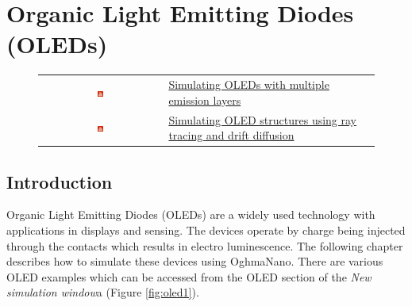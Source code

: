 \chapter{Organic Light Emitting Diodes (OLEDs)}
\label{sec:bhj}

\begin{figure}[H]

\begin{tabular}{ c l }

\includegraphics[width=0.05\textwidth]{./images/youtube.png}

&
\href{https://www.youtube.com/watch?v=UPGc_GFWd-o}{Simulating OLEDs with multiple emission layers}
\\
\includegraphics[width=0.05\textwidth]{./images/youtube.png}

&
\href{https://www.youtube.com/watch?v=xhp_8e17tpU}{Simulating OLED structures using ray tracing and drift diffusion}
\\
\end{tabular}
\end{figure}

\section{Introduction}
Organic Light Emitting Diodes (OLEDs) are a widely used technology with applications in displays and sensing.  The devices operate by charge being injected through the contacts which results in electro luminescence. The following chapter describes how to simulate these devices using OghmaNano. There are various OLED examples which can be accessed from the OLED section of the \emph{New simulation window}a (Figure \ref{fig:oled1}).

